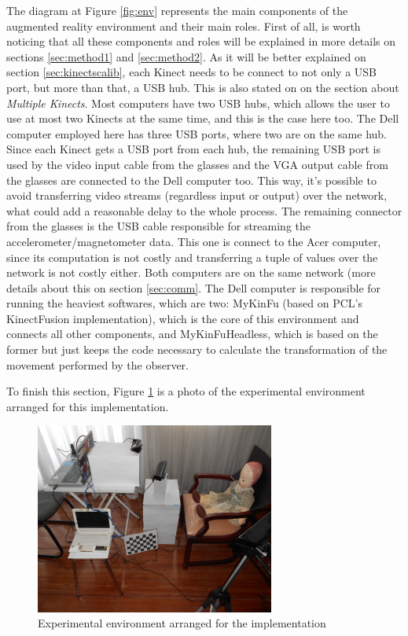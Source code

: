 \documentclass[msc, a4paper, classic, en]{ufbathesis}
\begin{document}
The diagram at Figure \ref{fig:env} represents the main components of the augmented reality environment and their main roles. First of all, is worth noticing that all these components and roles will be explained in more details on sections \ref{sec:method1} and \ref{sec:method2}. As it will be better explained on section \ref{sec:kinectscalib}, each Kinect needs to be connect to not only a USB port, but more than that, a USB hub. This is also stated on \cite{kinecthacks} on the section about \textit{Multiple Kinects}. Most computers have two USB hubs, which allows the user to use at most two Kinects at the same time, and this is the case here too. The Dell computer employed here has three USB ports, where two are on the same hub. Since each Kinect gets a USB port from each hub, the remaining USB port is used by the video input cable from the glasses and the VGA output cable from the glasses are connected to the Dell computer too. This way, it's possible to avoid transferring video streams (regardless input or output) over the network, what could add a reasonable delay to the whole process. The remaining connector from the glasses is the USB cable responsible for streaming the accelerometer/magnetometer data. This one is connect to the Acer computer, since its computation is not costly and transferring a tuple of values over the network is not costly either. Both computers are on the same network (more details about this on section \ref{sec:comm}. The Dell computer is responsible for running the heaviest softwares, which are two: MyKinFu (based on PCL's KinectFusion implementation), which is the core of this environment and connects all other components, and MyKinFuHeadless, which is based on the former but just keeps the code necessary to calculate the transformation of the movement performed by the observer.

To finish this section, Figure \ref{fig:expenv} is a photo of the experimental environment arranged for this implementation.

\begin{figure}
\centering
\includegraphics[width=0.7\textwidth]{images/expenv.jpg}
\caption{Experimental environment arranged for the implementation}
\label{fig:expenv}
\end{figure}
\end{document}
